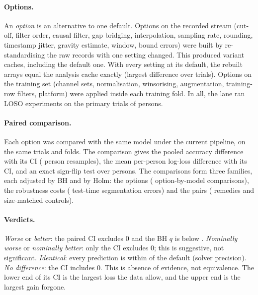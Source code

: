 \paragraph{Options.} An \emph{option} is an alternative to one default. Options on the recorded stream
(cut-off, filter order, causal filter, gap bridging, interpolation, sampling rate, rounding, timestamp
jitter, gravity estimate, window, bound errors) were built by re-standardising the raw records with one
setting changed. This produced  variant caches, including the default one. With every
setting at its default, the rebuilt arrays equal the analysis cache exactly (largest difference
 over  trials). Options on the training set
(channel sets, normalisation, winsorising, augmentation, training-row filters, platform) were applied inside
each training fold. In all, the lane ran  LOSO experiments on the 
primary trials of  persons.

\paragraph{Paired comparison.} Each option was compared with the same model under the current pipeline,
on the same trials and folds. The comparison gives the pooled accuracy difference with its CI
( person resamples), the mean per-person log-loss difference with its CI, and an exact
sign-flip test over persons. The comparisons form three families, each adjusted by BH and by Holm: the
options ( option-by-model comparisons), the robustness costs
( test-time segmentation errors) and the pairs ( remedies
and size-matched controls).

\paragraph{Verdicts.} \emph{Worse} or \emph{better}: the paired CI excludes 0 and the BH $q$ is below
. \emph{Nominally worse} or \emph{nominally better}: only the CI excludes 0; this is suggestive,
not significant. \emph{Identical}: every prediction is within  of the default (solver
precision). \emph{No difference}: the CI includes 0. This is absence of evidence, not equivalence. The
lower end of its CI is the largest loss the data allow, and the upper end is the largest gain forgone.

